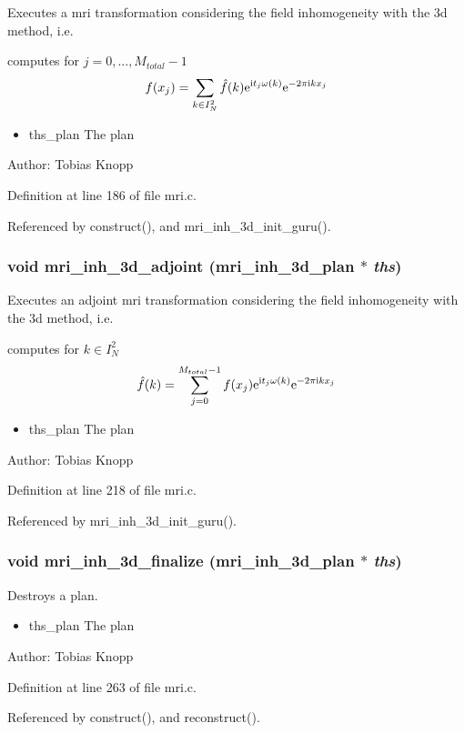 Executes a mri transformation considering the field inhomogeneity with the 3d method, i.e. 

computes for $j=0,...,M_{total}-1$ \[ f(x_j) = \sum_{k \in I_N^2} \hat{f}(k) {\rm e}^{\mbox{\rm\scriptsize i} t_j \omega(k)} {\rm e}^{-2 \pi \mbox{\rm\scriptsize i} k x_j} \]

\begin{itemize}
\item ths\_\-plan The plan\end{itemize}
\begin{Desc}
\item[Author:]Tobias Knopp \end{Desc}


Definition at line 186 of file mri.c.

Referenced by construct(), and mri\_\-inh\_\-3d\_\-init\_\-guru().\hypertarget{group__mri_gc385874f7e751acd9120537ac58069b8}{
\subsubsection{\setlength{\rightskip}{0pt plus 5cm}void mri\_\-inh\_\-3d\_\-adjoint ({\bf mri\_\-inh\_\-3d\_\-plan} $\ast$ {\em ths})}}
\label{group__mri_gc385874f7e751acd9120537ac58069b8}


Executes an adjoint mri transformation considering the field inhomogeneity with the 3d method, i.e. 

computes for $k \in I_N^2$ \[ \hat{f}(k) = \sum_{j=0}^{M_{total}-1} f(x_j) {\rm e}^{\mbox{\rm\scriptsize i} t_j \omega(k)} {\rm e}^{-2 \pi \mbox{\rm\scriptsize i} k x_j} \]

\begin{itemize}
\item ths\_\-plan The plan\end{itemize}
\begin{Desc}
\item[Author:]Tobias Knopp \end{Desc}


Definition at line 218 of file mri.c.

Referenced by mri\_\-inh\_\-3d\_\-init\_\-guru().\hypertarget{group__mri_gdcf8b78420d90797f43abb15be1d9cf5}{
\subsubsection{\setlength{\rightskip}{0pt plus 5cm}void mri\_\-inh\_\-3d\_\-finalize ({\bf mri\_\-inh\_\-3d\_\-plan} $\ast$ {\em ths})}}
\label{group__mri_gdcf8b78420d90797f43abb15be1d9cf5}


Destroys a plan. 

\begin{itemize}
\item ths\_\-plan The plan\end{itemize}
\begin{Desc}
\item[Author:]Tobias Knopp \end{Desc}


Definition at line 263 of file mri.c.

Referenced by construct(), and reconstruct().